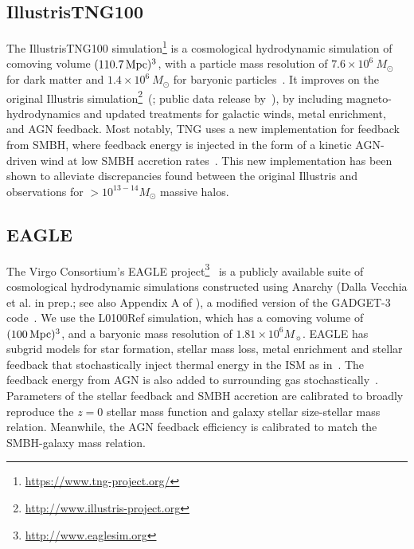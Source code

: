 \subsection{IllustrisTNG100} \label{sec:tng}
The IllustrisTNG100 simulation\footnote{\url{https://www.tng-project.org/}}
is a cosmological hydrodynamic simulation of comoving volume 
$(110.7\,{\rm Mpc})^3$, with a particle mass resolution of $7.6 \times 10^{6}\ M_\odot$ for dark matter and $1.4 \times 10^{6}\ M_\odot$ for baryonic particles~\citep{nelson2018, pillepich2018, springel2018, marinacci2018, naiman2018}. It improves on
the original Illustris simulation\footnote{\url{http://www.illustris-project.org}}~(\citealt{vogelsberger2014, genel2014};
public data release by~\citealt{nelson2015}), by including
magneto-hydrodynamics and updated treatments for galactic winds, metal
enrichment, and AGN feedback. Most notably, TNG uses a new implementation for
feedback from SMBH, where feedback energy is injected in the form of a kinetic
AGN-driven wind at low SMBH accretion rates~\citep{weinberger2018}. This new
implementation has been shown to alleviate discrepancies found between the
original Illustris and observations for $> 10^{13-14} M_\odot$ massive halos. 

\subsection{EAGLE} \label{sec:eagle} 
The Virgo Consortium's EAGLE
project\footnote{\url{http://www.eaglesim.org}}~\citep{schaye2015, crain2015,
mcalpine2016} is a publicly available suite of cosmological hydrodynamic
simulations constructed using {\sc Anarchy} (Dalla Vecchia et al. in prep.; 
see also Appendix A of \citealt{schaye2015}), a modified version of the 
{\sc GADGET-3} code~\citep{springel2005}. We use the L0100Ref simulation,
which has a comoving volume of $(100\,{\rm Mpc})^3$, and a baryonic mass resolution of $1.81\times 10^6M_{\sun}$. %
EAGLE has subgrid models for star formation, stellar mass loss, metal enrichment
and stellar feedback that stochastically inject thermal energy in the ISM as
in~\cite{dallavecchia2012}. The feedback energy from AGN is also added to
surrounding gas stochastically~\citep{booth2009}. Parameters of the stellar 
feedback and SMBH accretion are calibrated to broadly reproduce the $z=0$ 
stellar mass function and galaxy stellar size-stellar mass relation. Meanwhile, 
the AGN feedback efficiency is calibrated to match the SMBH-galaxy mass relation. 

